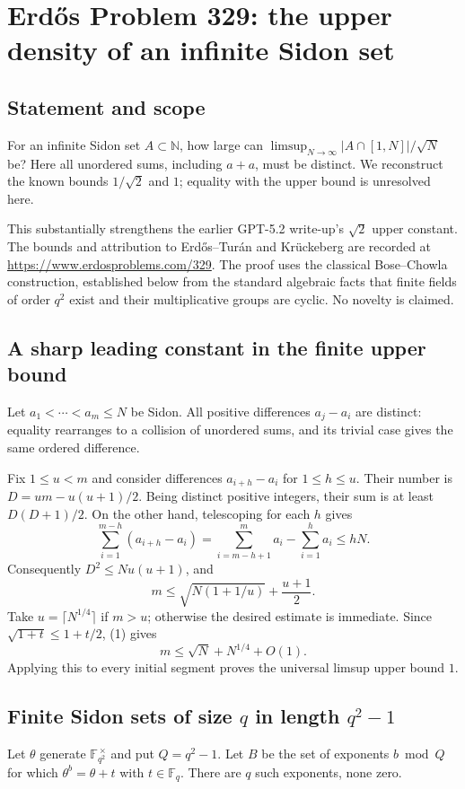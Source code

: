 \section*{Erd\H{o}s Problem 329: the upper density of an infinite Sidon set}
\subsection*{Statement and scope}
For an infinite Sidon set $A\subset\mathbb N$, how large can
$\limsup_{N\to\infty}|A\cap[1,N]|/\sqrt N$ be? Here all unordered sums, including $a+a$, must be distinct. We reconstruct the known bounds $1/\sqrt2$ and $1$; equality with the upper bound is unresolved here.

This substantially strengthens the earlier GPT-5.2 write-up's $\sqrt2$ upper constant. The bounds and attribution to Erd\H{o}s--Tur\'an and Kr\"uckeberg are recorded at \url{https://www.erdosproblems.com/329}. The proof uses the classical Bose--Chowla construction, established below from the standard algebraic facts that finite fields of order $q^2$ exist and their multiplicative groups are cyclic. No novelty is claimed.

\subsection*{A sharp leading constant in the finite upper bound}
Let $a_1<\cdots<a_m\le N$ be Sidon. All positive differences $a_j-a_i$ are distinct: equality rearranges to a collision of unordered sums, and its trivial case gives the same ordered difference.

Fix $1\le u<m$ and consider differences $a_{i+h}-a_i$ for $1\le h\le u$. Their number is
$D=um-u(u+1)/2$. Being distinct positive integers, their sum is at least $D(D+1)/2$. On the other hand, telescoping for each $h$ gives
\[
 \sum_{i=1}^{m-h}(a_{i+h}-a_i)
 =\sum_{i=m-h+1}^m a_i-\sum_{i=1}^h a_i\le hN.
\]
Consequently $D^2\le Nu(u+1)$, and
\[
 m\le\sqrt{N(1+1/u)}+\frac{u+1}{2}. \tag{1}
\]
Take $u=\lceil N^{1/4}\rceil$ if $m>u$; otherwise the desired estimate is immediate. Since $\sqrt{1+t}\le1+t/2$, (1) gives
\[
 m\le\sqrt N+N^{1/4}+O(1).
\]
Applying this to every initial segment proves the universal limsup upper bound $1$.

\subsection*{Finite Sidon sets of size $q$ in length $q^2-1$}
Let $\theta$ generate $\mathbb F_{q^2}^{\,\times}$ and put $Q=q^2-1$. Let $B$ be the set of exponents $b\bmod Q$ for which $\theta^b=\theta+t$ with $t\in\mathbb F_q$. There are $q$ such exponents, none zero.

